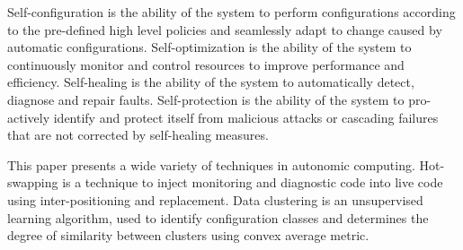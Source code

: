 
Self-configuration is the ability of the system to perform configurations according to the pre-defined high level policies and seamlessly adapt to change caused by automatic configurations. Self-optimization is the ability of the system to continuously monitor and control resources to improve performance and efficiency. Self-healing is the ability of the system to automatically detect, diagnose and repair faults. Self-protection is the ability of the system to pro-actively identify and protect itself from malicious attacks or cascading failures that are not corrected by self-healing measures.

This paper presents a wide variety of techniques in autonomic computing. Hot-swapping is a technique to inject monitoring and diagnostic code into live code using inter-positioning and replacement. Data clustering is an unsupervised learning algorithm, used to identify configuration classes and determines the degree of similarity between clusters using convex average metric.

